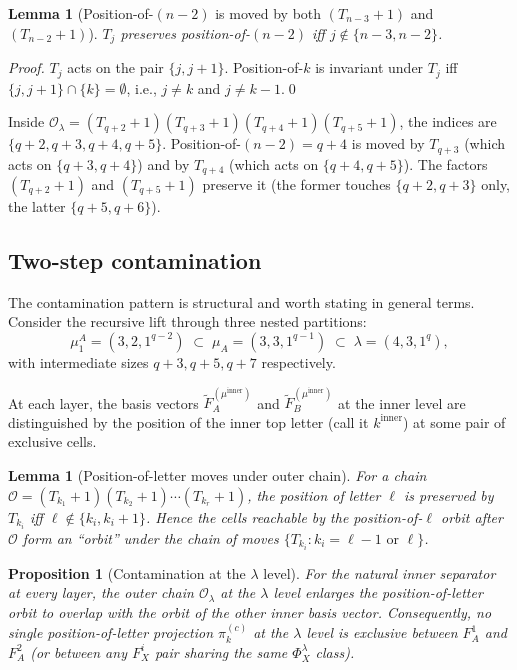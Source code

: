\documentclass[11pt]{article}
\newtheorem{lemma}[theorem]{Lemma}
\newtheorem{proposition}[theorem]{Proposition}
\theoremstyle{definition}
\begin{document}
\begin{lemma}[Position-of-$(n-2)$ is moved by both $(T_{n-3}+1)$ and $(T_{n-2}+1)$]\label{lem:posn-2-move}
$T_j$ preserves position-of-$(n-2)$ iff $j \notin \{n-3, n-2\}$.
\end{lemma}

\begin{proof}
$T_j$ acts on the pair $\{j, j+1\}$. Position-of-$k$ is invariant
under $T_j$ iff $\{j, j+1\} \cap \{k\} = \emptyset$, i.e.,
$j \ne k$ and $j \ne k-1$.\qed
\end{proof}

Inside $\mathcal{O}_\lambda = (T_{q+2}+1)(T_{q+3}+1)(T_{q+4}+1)(T_{q+5}+1)$,
the indices are $\{q+2, q+3, q+4, q+5\}$. Position-of-$(n-2) = q+4$ is
moved by $T_{q+3}$ (which acts on $\{q+3, q+4\}$) and by $T_{q+4}$
(which acts on $\{q+4, q+5\}$). The factors $(T_{q+2}+1)$ and
$(T_{q+5}+1)$ preserve it (the former touches $\{q+2, q+3\}$ only,
the latter $\{q+5, q+6\}$).

\subsection{Two-step contamination}

The contamination pattern is structural and worth stating in general
terms. Consider the recursive lift through three nested partitions:
\[
   \mu_1^A = (3, 2, 1^{q-2}) \;\subset\; \mu_A = (3, 3, 1^{q-1}) \;\subset\; \lambda = (4, 3, 1^q),
\]
with intermediate sizes $q+3, q+5, q+7$ respectively.

At each layer, the basis vectors $\widetilde F^{(\mu^{\text{inner}})}_A$
and $\widetilde F^{(\mu^{\text{inner}})}_B$ at the inner level are
distinguished by the position of the inner top letter (call it
$k^{\text{inner}}$) at some pair of exclusive cells.

\begin{lemma}[Position-of-letter moves under outer chain]\label{lem:pos-move}
For a chain
$\mathcal{O} = (T_{k_1}+1)(T_{k_2}+1)\cdots(T_{k_r}+1)$, the position
of letter $\ell$ is preserved by $T_{k_i}$ iff
$\ell \notin \{k_i, k_i + 1\}$. Hence the cells reachable by the
position-of-$\ell$ orbit after $\mathcal{O}$ form an ``orbit'' under
the chain of moves
$\{T_{k_i} : k_i = \ell - 1 \text{ or } \ell\}$.
\end{lemma}

\begin{proposition}[Contamination at the $\lambda$ level]\label{prop:contamination}
For the natural inner separator at every layer, the outer chain
$\mathcal{O}_\lambda$ at the $\lambda$ level enlarges the
position-of-letter orbit to overlap with the orbit of the other inner
basis vector. Consequently, no single position-of-letter projection
$\pi^{(c)}_k$ at the $\lambda$ level is exclusive between
$F_A^1$ and $F_A^2$ (or between any $F_X^i$ pair sharing the same
$\Phi_X^\lambda$ class).
\end{proposition}
\end{document}
